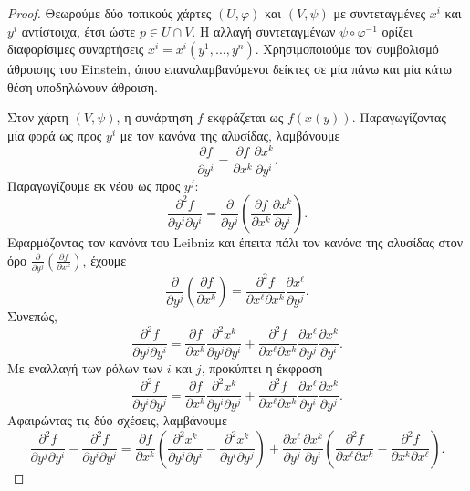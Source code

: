 \documentclass[11pt,a4paper,twoside,openright]{book}
\begin{document}
\begin{proof}
Θεωρούμε δύο τοπικούς χάρτες \((U, \varphi)\) και \((V, \psi)\) με συντεταγμένες \(x^i\) και \(y^i\) αντίστοιχα, έτσι ώστε \(p \in U \cap V\). Η αλλαγή συντεταγμένων \(\psi \circ \varphi^{-1}\) ορίζει διαφορίσιμες συναρτήσεις \(x^i = x^i(y^1, \dots, y^n)\). Χρησιμοποιούμε τον συμβολισμό άθροισης του Einstein, όπου επαναλαμβανόμενοι δείκτες σε μία πάνω και μία κάτω θέση υποδηλώνουν άθροιση.

Στον χάρτη \((V, \psi)\), η συνάρτηση \(f\) εκφράζεται ως \(f(x(y))\). Παραγωγίζοντας μία φορά ως προς \(y^i\) με τον κανόνα της αλυσίδας, λαμβάνουμε
\begin{equation}
\frac{\partial f}{\partial y^i} = \frac{\partial f}{\partial x^k} \frac{\partial x^k}{\partial y^i}.
\end{equation}
Παραγωγίζουμε εκ νέου ως προς \(y^j\):
\begin{equation}
\frac{\partial^2 f}{\partial y^j \partial y^i} = \frac{\partial}{\partial y^j}\left( \frac{\partial f}{\partial x^k} \frac{\partial x^k}{\partial y^i} \right).
\end{equation}
Εφαρμόζοντας τον κανόνα του Leibniz και έπειτα πάλι τον κανόνα της αλυσίδας στον όρο \(\frac{\partial}{\partial y^j}\left( \frac{\partial f}{\partial x^k} \right)\), έχουμε
\begin{equation}
\frac{\partial}{\partial y^j}\left( \frac{\partial f}{\partial x^k} \right) = \frac{\partial^2 f}{\partial x^\ell \partial x^k} \frac{\partial x^\ell}{\partial y^j}.
\end{equation}
Συνεπώς,
\begin{equation}
\frac{\partial^2 f}{\partial y^j \partial y^i} = \frac{\partial f}{\partial x^k} \frac{\partial^2 x^k}{\partial y^j \partial y^i} + \frac{\partial^2 f}{\partial x^\ell \partial x^k} \frac{\partial x^\ell}{\partial y^j} \frac{\partial x^k}{\partial y^i}.
\end{equation}
Με εναλλαγή των ρόλων των \(i\) και \(j\), προκύπτει η έκφραση
\begin{equation}
\frac{\partial^2 f}{\partial y^i \partial y^j} = \frac{\partial f}{\partial x^k} \frac{\partial^2 x^k}{\partial y^i \partial y^j} + \frac{\partial^2 f}{\partial x^\ell \partial x^k} \frac{\partial x^\ell}{\partial y^i} \frac{\partial x^k}{\partial y^j}.
\end{equation}
Αφαιρώντας τις δύο σχέσεις, λαμβάνουμε
\begin{equation}
\frac{\partial^2 f}{\partial y^j \partial y^i} - \frac{\partial^2 f}{\partial y^i \partial y^j} = \frac{\partial f}{\partial x^k} \left( \frac{\partial^2 x^k}{\partial y^j \partial y^i} - \frac{\partial^2 x^k}{\partial y^i \partial y^j} \right) + \frac{\partial x^\ell}{\partial y^j} \frac{\partial x^k}{\partial y^i} \left( \frac{\partial^2 f}{\partial x^\ell \partial x^k} - \frac{\partial^2 f}{\partial x^k \partial x^\ell} \right).

\end{equation}
\end{proof}
\end{document}
